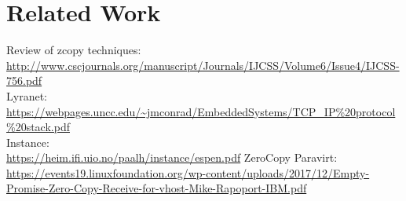 \section{Related Work}
Review of zcopy techniques:\\
\url{http://www.cscjournals.org/manuscript/Journals/IJCSS/Volume6/Issue4/IJCSS-756.pdf}\\
Lyranet:\\
\url{https://webpages.uncc.edu/~jmconrad/EmbeddedSystems/TCP_IP\%20protocol\%20stack.pdf}\\
Instance:\\
\url{https://heim.ifi.uio.no/paalh/instance/espen.pdf}
ZeroCopy Paravirt:\\
\url{https://events19.linuxfoundation.org/wp-content/uploads/2017/12/Empty-Promise-Zero-Copy-Receive-for-vhost-Mike-Rapoport-IBM.pdf}

